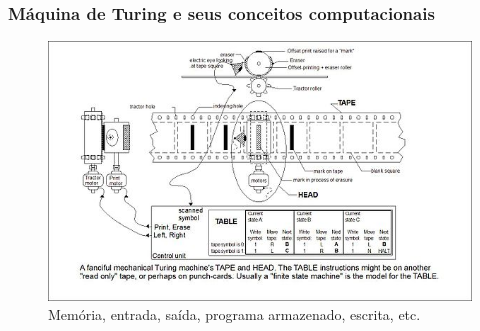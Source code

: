\documentclass[10pt]{beamer}
\begin{document}
\begin{frame}[fragile]

\frametitle{ Máquina de Turing  e seus conceitos computacionais}
\begin{figure}[!ht]
	\centering
	
	\includegraphics[height =.65\textheight,width=.8\textwidth]
	{figuras/turing_machine_mecanica.jpg}
	\caption{Memória, entrada, saída, programa armazenado, escrita, etc.}
\end{figure}

\end{frame}


\end{document}
